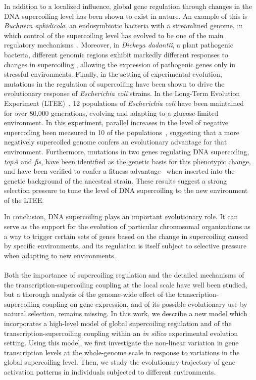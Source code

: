 In addition to a localized influence, global gene regulation through changes in the DNA supercoiling level has been shown to exist in nature.
An example of this is \emph{Buchnera aphidicola}, an endosymbiotic bacteria with a streamlined genome, in which control of the supercoiling level has evolved to be one of the main regulatory mechanisms~\citep{brinza2013}.
Moreover, in \emph{Dickeya dadantii}, a plant pathogenic bacteria, different genomic regions exhibit markedly different responses to changes in supercoiling \citep{muskhelishvili2019}, allowing the expression of pathogenic genes only in stressful environments.
Finally, in the setting of experimental evolution, mutations in the regulation of supercoiling have been shown to drive the evolutionary response of \emph{Escherichia coli} strains.
In the Long-Term Evolution Experiment (LTEE)~\citep{lenski1991}, 12 populations of \emph{Escherichia coli} have been maintained for over 80,000 generations, evolving and adapting to a glucose-limited environment.
In this experiment, parallel increases in the level of negative supercoiling been measured in 10 of the populations~\citep{crozat2010}, suggesting that a more negatively supercoiled genome confers an evolutionary advantage for that environment.
Furthermore, mutations in two genes regulating DNA supercoiling, \emph{topA} and \emph{fis}, have been identified as the genetic basis for this phenotypic change, and have been verified to confer a fitness advantage~\citep{crozat2005} when inserted into the genetic background of the ancestral strain.
These results suggest a strong selection pressure to tune the level of DNA supercoiling to the new environment of the LTEE.

In conclusion, DNA supercoiling plays an important evolutionary role.
It can serve as the support for the evolution of particular chromosomal organizations as a way to trigger certain sets of genes based on the change in supercoiling caused by specific environments, and its regulation is itself subject to selective pressure when adapting to new environments.

\paragraph{}
Both the importance of supercoiling regulation and the detailed mechanisms of the transcription-supercoiling coupling at the local scale have well been studied, but a thorough analysis of the genome-wide effect of the transcription-supercoiling coupling on gene expression, and of its possible evolutionary use by natural selection, remains missing.
In this work, we describe a new model which incorporates a high-level model of global supercoiling regulation and of the transcription-supercoiling coupling within an \emph{in silico} experimental evolution setting.
Using this model, we first investigate the non-linear variation in gene transcription levels at the whole-genome scale in response to variations in the global supercoiling level.
Then, we study the evolutionary trajectory of gene activation patterns in individuals subjected to different environments.

